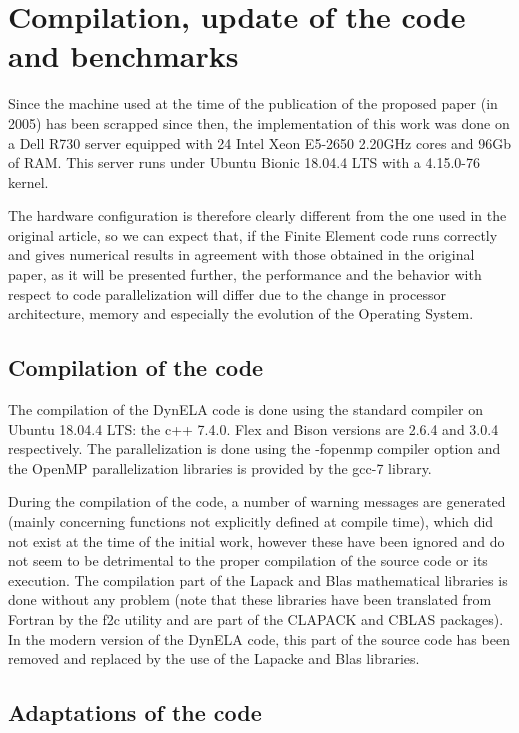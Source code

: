 \section{Compilation, update of the code and benchmarks}

Since the machine used at the time of the publication of the proposed paper (in 2005) has been scrapped since then, the implementation of this work was done on a Dell R730 server equipped with 24 Intel Xeon E5-2650 2.20GHz cores and 96Gb of RAM. This server runs under Ubuntu Bionic 18.04.4 LTS with a 4.15.0-76 kernel. 

The hardware configuration is therefore clearly different from the one used in the original article, so we can expect that, if the Finite Element code runs correctly and gives numerical results in agreement with those obtained in the original paper, as it will be presented further, the performance and the behavior with respect to code parallelization will differ due to the change in processor architecture, memory and especially the evolution of the Operating System.

\subsection{Compilation of the code}

The compilation of the DynELA code is done using the standard compiler on Ubuntu 18.04.4 LTS: the c++ 7.4.0. Flex and Bison versions are 2.6.4 and 3.0.4 respectively. The parallelization is done using the -fopenmp compiler option and the OpenMP parallelization libraries is provided by the gcc-7 library.

During the compilation of the code, a number of warning messages are generated (mainly concerning functions not explicitly defined at compile time), which did not exist at the time of the initial work, however these have been ignored and do not seem to be detrimental to the proper compilation of the source code or its execution. The compilation part of the Lapack and Blas mathematical libraries is done without any problem (note that these libraries have been translated from Fortran by the f2c utility and are part of the CLAPACK and CBLAS packages). In the modern version of the DynELA code, this part of the source code has been removed and replaced by the use of the Lapacke and Blas libraries.

\subsection{Adaptations of the code}

